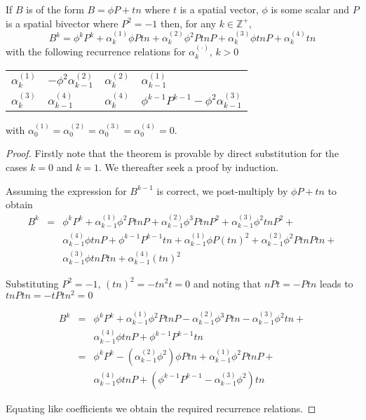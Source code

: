 \begin{lemma}
\label{lem:bk}
If $B$ is of the form $B=\phi P+tn$ where 
$t$ is a spatial vector, $\phi$ is some scalar and $P$ is a spatial bivector
where $P^2 = -1$ then, for any $k \in \mathbb{Z}^+$, 
\[
B^{k}=\phi^k P^{k}+\alpha _{k}^{(1)}\phi Ptn+
\alpha _{k}^{(2)}\phi^2 PtnP+\alpha _{k}^{(3)}\phi tnP+\alpha _{k}^{(4)}tn
\]
with the following recurrence relations for $\alpha _{k}^{(\cdot )}$,
$k>0$ 

\begin{centering}

\begin{tabular}{r@{$\ =\ $}lr@{$\ =\ $}l}
$\alpha _{k}^{(1)}$ & $- \phi^2 \alpha _{k-1}^{(2)}$ &
$\alpha _{k}^{(2)}$ & $\alpha _{k-1}^{(1)}$\\
$\alpha _{k}^{(3)}$ & $\alpha _{k-1}^{(4)}$ &
$\alpha _{k}^{(4)}$ & $\phi^{k-1}P^{k-1} - \phi^2 \alpha_{k-1}^{(3)}$
\end{tabular}

\end{centering}

\noindent with 
$\alpha _{0}^{(1)}=\alpha _{0}^{(2)}=
\alpha _{0}^{(3)}=\alpha _{0}^{(4)}=0$.
\end{lemma}
\begin{proof}
Firstly note that the theorem is provable by direct 
substitution for the cases $k=0$ and $k=1$. We thereafter seek a 
proof by induction.

Assuming the expression for $B^{k-1}$ is correct, we post-multiply
by $\phi P+tn$ to obtain
\begin{eqnarray*}
B^k & = & \phi^k P^k + \alpha_{k-1}^{(1)}\phi^2 PtnP + 
          \alpha_{k-1}^{(2)}\phi^3 PtnP^2 + \alpha_{k-1}^{(3)}\phi^2 tnP^2 + \\
    &   & \alpha_{k-1}^{(4)}\phi tnP + \phi^{k-1} P^{k-1} tn + \alpha_{k-1}^{(1)}\phi P(tn)^2 +
          \alpha_{k-1}^{(2)}\phi^2 PtnPtn + \\
    &   & \alpha_{k-1}^{(3)}\phi tnPtn +
	  \alpha_{k-1}^{(4)}(tn)^2
\end{eqnarray*}

Substituting $P^2 = -1$, $(tn)^2 = - tn^2t = 0$ and noting that
$nPt = - Ptn$ leads to $tnPtn = - tPtn^2 = 0$

\begin{eqnarray*}
B^k & = & \phi^k P^k + \alpha_{k-1}^{(1)}\phi^2 PtnP -
          \alpha_{k-1}^{(2)}\phi^3 Ptn - \alpha_{k-1}^{(3)}\phi^2 tn + \\
    &   & \alpha_{k-1}^{(4)}\phi tnP + \phi^{k-1} P^{k-1} tn \\
    & = & \phi^k P^k - (\alpha_{k-1}^{(2)}\phi^2)\phi Ptn +
          \alpha_{k-1}^{(1)}\phi^2 PtnP + \\
    &   & \alpha_{k-1}^{(4)}\phi tnP +
	  (\phi^{k-1} P^{k-1}  - \alpha_{k-1}^{(3)}\phi^2) tn
\end{eqnarray*}

Equating like coefficients we obtain the required recurrence relations.
\end{proof}

